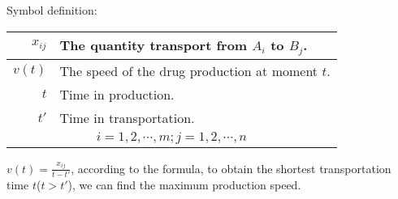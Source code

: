 Symbol definition:
\begin{center}
\begin{tabular}{|r|p{8cm}|}
\hline
$ x_{ij} $ & The quantity transport from $ A_i $ to
$ B_j $.\\
\hline
$ v(t) $ & The speed of the drug production at moment $t$.\\
\hline
$ t $ & Time in production.\\
\hline
$ t' $ & Time in transportation.\\
\hline
\multicolumn{2}{|c|}{$ i=1,2,\cdots,m;j=1,2,\cdots,n $}\\
\hline
\end{tabular}
\end{center}%
$v(t)=\frac{x_{ij}}{t-t'}$, according to the formula, to obtain
the shortest transportation time $t$($t>t'$), we can find the
maximum production speed.
